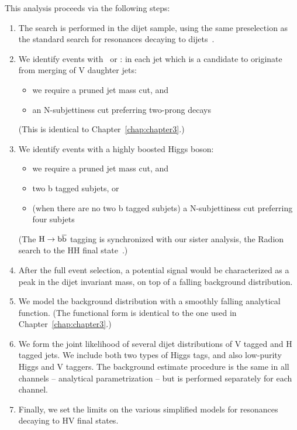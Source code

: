 This analysis proceeds via the following steps:
\begin{enumerate}
\item The search is performed in the dijet sample, using the same
      preselection as the standard search for resonances decaying to 
      dijets~\cite{cmsdijet, cmsdijet8TeV}.

\item We identify events with \PW\ or \cPZ: in each jet which is a candidate
  to originate from merging of V daughter jets:  
  \begin{itemize}
  \item we require a pruned jet mass cut, and
  \item an N-subjettiness cut preferring two-prong decays
  \end{itemize}
  (This is identical to Chapter~\ref{chap:chapter3}.)

\item We identify events with a highly boosted Higgs boson:
  \begin{itemize}
  \item we require a pruned jet mass cut, and
  \item two b tagged subjets, or 
  \item (when there are no two b tagged subjets) a N-subjettiness cut
    preferring four subjets
  \end{itemize}
  (The ${\rm H\to\mathrm{b\overline{b}}}$ tagging is synchronized with our sister analysis, the Radion
  search to the HH final state~\cite{HH4b}.)

\item After the full event selection, a potential signal would be
  characterized as a peak in the dijet invariant mass, on top of a
  falling background distribution.  

\item We model the background distribution with a smoothly falling 
  analytical function.  (The functional form is identical
  to the one used in Chapter~\ref{chap:chapter3}.)

\item We form the joint likelihood of several dijet distributions
  of V tagged and H tagged jets.  We include both two types of
  Higgs tags, and also low-purity Higgs and V taggers.  The background
  estimate procedure is the same in all channels -- analytical
  parametrization -- but is performed separately for each channel.

\item Finally, we set the limits on the various simplified models
  for resonances decaying to HV final states.

\end{enumerate}
